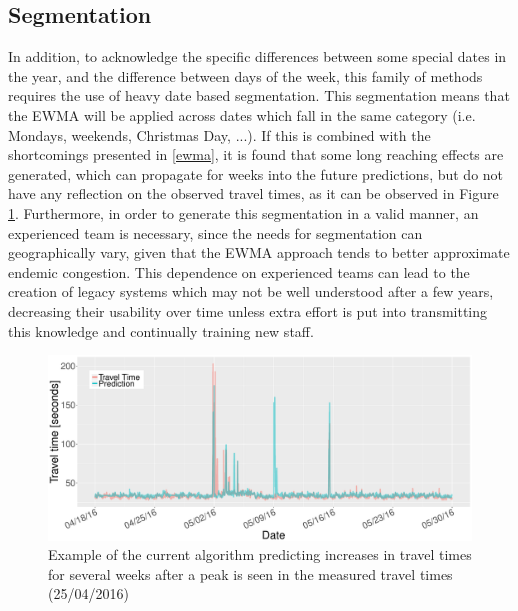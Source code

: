 \documentclass[conference]{IEEEtran}
\begin{document}
\subsection{Segmentation}\label{segmentation}
In addition, to acknowledge the specific differences between some special dates in the year, and the difference between days of the week, this family of methods requires the use of heavy date based segmentation. 
This segmentation means that the EWMA will be applied across dates which fall in the same category (i.e. Mondays, weekends, Christmas Day, ...).
If this is combined with the shortcomings presented in \ref{ewma}, it is found that some long reaching effects are generated, which can propagate for weeks into the future predictions, but do not have any reflection on the observed travel times, as it can be observed in Figure \ref{fig:EWMA_spike}.
Furthermore, in order to generate this segmentation in a valid manner, an experienced team is necessary, since the needs for segmentation can geographically vary, given that the EWMA approach tends to better approximate endemic congestion. 
This dependence on experienced teams can lead to the creation of legacy systems which may not be well understood after a few years, decreasing their usability over time unless extra effort is put into transmitting this knowledge and continually training new staff.
\begin{figure}
	\includegraphics[width=\linewidth]{EWMA.pdf}
	\caption{Example of the current algorithm predicting increases in travel times for several weeks after a peak is seen in the measured travel times (25/04/2016)}
	\label{fig:EWMA_spike}
\end{figure}
\end{document}
